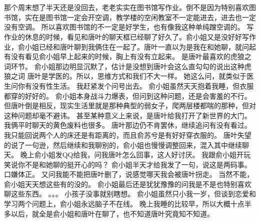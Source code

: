 \chapter{}
那个周末想了半天还是没回去，老老实实在图书馆写作业。倒不是因为特别喜欢图书馆，实在是图书馆一定会开空调，教学楼的空闲教室不一定能进去，进去也一定没有空调。
所以喜欢图书馆的不一定是好学生，也有像我这种单纯蹭空调的。
写作业的休息的时候，看见和唐叶的聊天框已经聊了好久了。俞小姐又是没好好写作业，俞小姐已经和唐叶聊到我俩住在一起了。唐叶一直以为是我在和她聊，就问起有没有看见俞小姐早上起来的时候，胸上有没有立起来。
是唐叶最喜欢的虎狼之词环节。
俞小姐那边明显沉默了，估计是没想到唐叶会这么直勾勾的说出这种虎狼之词
唐叶是学医的。所以，思维方式和我们不大一样。
她这么问，就类似于医生问你有没有性生活。
我赶紧发个问号出去。
俞小姐虽然天天抱着我睡，但衣服都穿的好好的。
俞小姐本身战斗力爆表，但问到这种问题，还是会害羞的不行。但唐叶倒是相反，现实生活里就是那种典型的弱女子，爬两层楼都喘的那种，但对这种问题却毫不避讳。
甚至某种意义上来说，是唐叶给我打开了新世界的大门。我俩平时聊天的黄色废料也很多。
唐叶那边仍不肯罢休，继续追问有没有看过。
我只能回说两个人的床还是有距离的，而且俞苏兮是有好好穿衣服的。
唐叶失望的说了一句逊，然后继续和我聊别的，俞小姐也慢慢调整回来，混入其中继续聊天。
晚上俞小姐发QQ给我，问我唐叶怎么回事，这人好讨厌。
我跟俞小姐开玩笑说你不是和她聊的挺开心的吗？
俞小姐半天才给我发了一句，说这是两码事。
口嫌体正。
又问我能不能把唐叶删了，说感觉哪天我会被唐叶拐走。
当然不能，俞小姐天天想这些有的没的。
俞小姐最后还是犹犹豫豫的问我是不是也特别喜欢聊这些东西。
。。。
小孩子没事就别瞎想。
俞小姐虽然只小我一岁，但谈到恋爱和学习两个问题上，俞小姐永远脑子不在线。
晚上我睡的比较早，所以大概十点半多以后，就全是俞小姐和唐叶在聊了，也不知道唐叶究竟知不知道。


